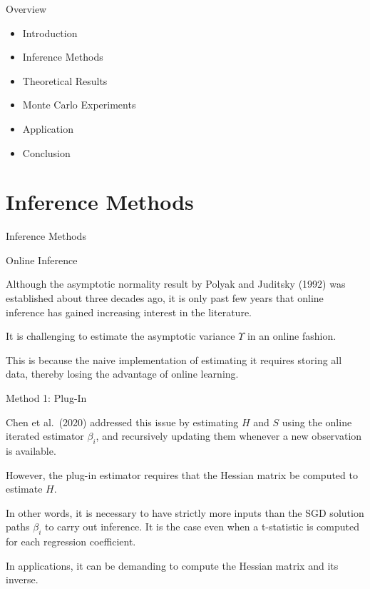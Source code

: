 \documentclass[beamer, t]{beamer}
\newcommand{\bit}{\begin{itemize}}
\newcommand{\eit}{\end{itemize}}
\begin{document}
\begin{frame}{Overview}
    \vfill
    \bit
        \item Introduction
        \item Inference Methods
        \item Theoretical Results
        \item Monte Carlo Experiments
        \item Application
        \item Conclusion
    \eit
    \vfill
\end{frame}




\section{Inference Methods}

\begin{frame}
   \vfill
   \centering
   \LARGE{Inference Methods}
   \vfill
\end{frame}

  

\begin{frame}{Online Inference}

Although the asymptotic normality result by Polyak and Juditsky (1992) was established about three decades ago, it is only past few years that online inference has gained increasing interest in the literature.
\bigskip

It is challenging to estimate the asymptotic variance $\Upsilon$  in an online fashion.
\bigskip


This is because
the naive implementation of estimating it requires storing all data, thereby losing the advantage of online learning.


\end{frame}



\begin{frame}{Method 1: Plug-In}


Chen et al.~(2020) addressed this issue by  estimating   $H$ and $S$ using the online iterated estimator $\beta_i$, and recursively updating   them   whenever a new observation  is available.

\bigskip 
However, the plug-in estimator requires that the Hessian matrix be computed to estimate $H$.

\bigskip
In other words, it is necessary to have strictly more inputs than  the SGD solution paths $\beta_i$ to carry out inference. It is the case even when a t-statistic is computed for each regression coefficient.

\bigskip
In applications, it can be demanding to compute the Hessian matrix and its inverse. 


\end{frame}
\end{document}
